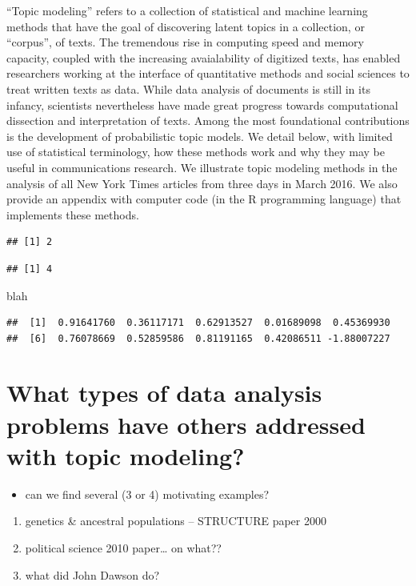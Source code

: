 \documentclass[12pt,]{article}
\providecommand{\tightlist}{%
  \setlength{\itemsep}{0pt}\setlength{\parskip}{0pt}}
\begin{document}
``Topic modeling'' refers to a collection of statistical and machine
learning methods that have the goal of discovering latent topics in a
collection, or ``corpus'', of texts. The tremendous rise in computing
speed and memory capacity, coupled with the increasing avaialability of
digitized texts, has enabled researchers working at the interface of
quantitative methods and social sciences to treat written texts as data.
While data analysis of documents is still in its infancy, scientists
nevertheless have made great progress towards computational dissection
and interpretation of texts. Among the most foundational contributions
is the development of probabilistic topic models. We detail below, with
limited use of statistical terminology, how these methods work and why
they may be useful in communications research. We illustrate topic
modeling methods in the analysis of all New York Times articles from
three days in March 2016. We also provide an appendix with computer code
(in the R programming language) that implements these methods.

\begin{verbatim}
## [1] 2
\end{verbatim}

\begin{verbatim}
## [1] 4
\end{verbatim}

blah

\begin{verbatim}
##  [1]  0.91641760  0.36117171  0.62913527  0.01689098  0.45369930
##  [6]  0.76078669  0.52859586  0.81191165  0.42086511 -1.88007227
\end{verbatim}

\section{What types of data analysis problems have others addressed with
topic
modeling?}\label{what-types-of-data-analysis-problems-have-others-addressed-with-topic-modeling}

\begin{itemize}
\tightlist
\item
  can we find several (3 or 4) motivating examples?
\end{itemize}

\begin{enumerate}
\def\labelenumi{\arabic{enumi}.}
\tightlist
\item
  genetics \& ancestral populations -- STRUCTURE paper 2000
\item
  political science 2010 paper\ldots{} on what??
\item
  what did John Dawson do?
\end{enumerate}
\end{document}
